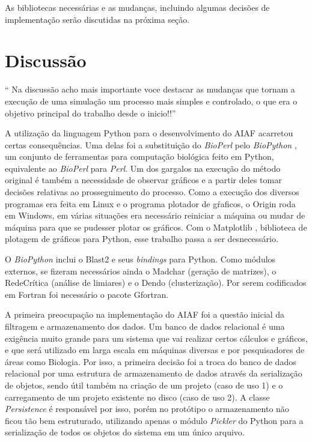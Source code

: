 As bibliotecas necessárias e as mudanças, incluindo algumas decisões de implementação serão discutidas na próxima seção.

\section{Discussão} \label{sec:discussao}

``
Na discussão acho mais importante voce destacar as mudanças que tornam a execução de uma simulação um processo mais simples e controlado,
o que era o objetivo principal do trabalho desde o inicio!!''

A utilização da linguagem Python para o desenvolvimento do AIAF acarretou certas consequências. Uma delas foi a substituição do \textit{BioPerl} pelo
\textit{BioPython} \cite{biopython}, um conjunto de ferramentas para computação biológica feito em Python, equivalente ao \textit{BioPerl} para \textit{Perl}.
Um dos gargalos na execução do método original é também a necessidade de observar gráficos e a partir deles tomar decisões relativas ao prosseguimento do
processo. Como a execução dos diversos programas era feita em Linux e o programa plotador de gŕaficos, o Origin \cite{origin} roda em Windows, em várias
situações era necessário reiniciar a máquina ou mudar de máquina para que se pudesser plotar os gráficos. Com o Matplotlib \cite{matplotlib}, biblioteca de 
plotagem de gráficos para Python, esse trabalho passa a ser desnecessário.

O \textit{BioPython} inclui o Blast2 e seus \textit{bindings} para Python. Como módulos externos, se fizeram necessários ainda o Madchar (geração de matrizes),
o RedeCrítica (análise de limiares) e o Dendo (clusterização). Por serem codificados em Fortran foi necessário o pacote Gfortran.

A primeira preocupação na implementação do AIAF foi a questão inicial da filtragem e armazenamento dos dados. Um banco de dados relacional é uma exigência
muito grande para um sistema que vai realizar certos cálculos e gráficos, e que será utilizado em larga escala em máquinas diversas e por pesquisadores de
áreas como Biologia. Por isso, a primeira decisão foi a troca do banco de dados relacional por uma estrutura de armazenamento de dados através da serialização
de objetos, sendo útil também na criação de um projeto (caso de uso 1) e o carregamento de um projeto existente no disco (caso de uso 2). A classe 
\textit{Persistence} é responsável por isso, porém no protótipo o armazenamento não ficou tão bem estruturado, utilizando apenas o módulo \textit{Pickler}
do Python para a serialização de todos os objetos do sistema em um único arquivo.


